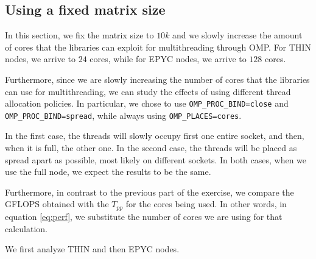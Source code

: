 \documentclass{report}
\begin{document}
\subsection{Using a fixed matrix size}

In this section, we fix the matrix size to $10k$ and we slowly increase the 
amount of cores that the libraries can exploit for multithreading through OMP. 
For THIN nodes, we arrive to $24$ cores, while for EPYC nodes, we arrive to 
$128$ cores.

Furthermore, since we are slowly increasing the number of cores that the libraries 
can use for multithreading, we can study the effects of using different 
thread allocation policies. In particular, we chose to use 
\texttt{OMP\_PROC\_BIND=close} and \texttt{OMP\_PROC\_BIND=spread}, while 
always using \texttt{OMP\_PLACES=cores}. 

In the first case, the threads will slowly occupy first one entire socket, and 
then, when it is full, the other one. In the second case, the threads will be 
placed as spread apart as possible, most likely on different sockets. 
In both cases, when we use the full node, we expect the results to be the same.

Furthermore, in contrast to the previous part of the exercise, we compare the 
GFLOPS obtained with the $T_{pp}$ for the cores being used. 
In other words, in equation \ref{eq:perf}, we substitute the number of cores 
we are using for that calculation.

We first analyze THIN and then EPYC nodes.
\end{document}

